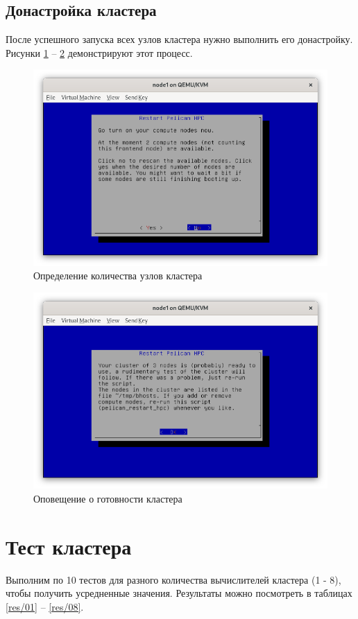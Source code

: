 \subsection{Донастройка кластера}

После успешного запуска всех узлов кластера нужно выполнить его донастройку. Рисунки \ref{postconf/01} -- \ref{postconf/02} демонстрируют этот процесс.

\begin{figure}[H]
	\centering
	\includegraphics[width=0.7\linewidth]{3-01}
	\caption{Определение количества узлов кластера}
	\label{postconf/01}
\end{figure}

\begin{figure}[H]
	\centering
	\includegraphics[width=0.7\linewidth]{3-02}
	\caption{Оповещение о готовности кластера}
	\label{postconf/02}
\end{figure}


\section{Тест кластера}
Выполним по 10 тестов для разного количества вычислителей кластера (1 - 8), чтобы получить усредненные значения. Результаты можно посмотреть в таблицах \ref{res/01} -- \ref{res/08}.

